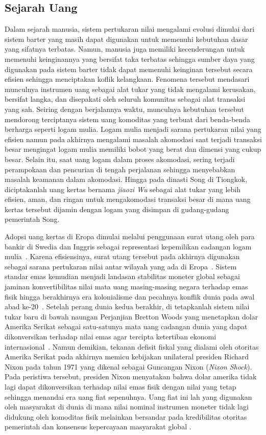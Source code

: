 \subsection{Sejarah Uang}
Dalam sejarah manusia, sistem pertukaran nilai mengalami evolusi dimulai dari sistem barter yang masih dapat digunakan untuk memenuhi kebutuhan dasar yang sifatnya terbatas. Namun, manusia juga memiliki kecenderungan untuk memenuhi keinginannya yang bersifat taka terbatas sehingga sumber daya yang digunakan pada sistem barter tidak dapat memenuhi keinginan tersebut secara efisien sehingga menciptakan koflik kelangkaan. Fenomena tersebut mendasari munculnya instrumen uang sebagai alat tukar yang tidak mengalami kerusakan, bersifat langka, dan disepakati oleh seluruh komunitas sebagai alat transaksi yang sah. Seiring dengan berjalannya waktu, munculnya kebutuhan tersebut mendorong terciptanya sistem uang komoditas yang terbuat dari benda-benda berharga seperti logam mulia. Logam mulia menjadi sarana pertukaran nilai yang efisien namun pada akhirnya mengalami masalah akomodasi saat terjadi transaksi besar mengingat logam mulia memiliki bobot yang berat dan dimensi yang cukup besar. Selain itu, saat uang logam dalam proses akomodasi, sering terjadi perampokaan dan pencurian di tengah perjalanan sehingga menyebabkan masalah keamanan dalam akomodasi. Hingga pada dinasti Song di Tiongkok, diciptakanlah uang kertas bernama \textit{jiaozi Wu} sebagai alat tukar yang lebih efisien, aman, dan ringan untuk mengakomodasi transaksi besar di mana uang kertas tersebut dijamin dengan logam yang disimpan di gudang-gudang pemerintah Song. 

Adopsi uang kertas di Eropa dimulai melalui penggunaan surat utang oleh para bankir di Swedia dan Inggris sebagai representasi kepemilikan cadangan logam mulia~. Karena efisiensinya, surat utang tersebut pada akhirnya digunakan sebagai sarana pertukaran nilai antar wilayah yang ada di Eropa~. Sistem standar emas kemudian menjadi landasan stabilitas moneter global sebagai jaminan konvertibilitas nilai mata uang masing-masing negara terhadap emas fisik hingga berakhirnya era kolonialisme dan pecahnya konflik dunia pada awal abad ke-20~. Setelah perang dunia kedua berakhir, di tetapkanlah sistem nilai tukar baru di bawah naungan Perjanjian Bretton Woods yang menetapkan dolar Amerika Serikat sebagai satu-satunya mata uang cadangan dunia yang dapat dikonversikan terhadap nilai emas  agar tercipta ketertiban ekonomi internasional~. Namun demikian, tekanan defisit fiskal yang dialami oleh otoritas Amerika Serikat pada akhirnya memicu kebijakan unilateral presiden Richard Nixon pada tahun 1971 yang dikenal sebagai Guncangan Nixon (\textit{Nixon Shock}). Pada peristiwa tersebut, presiden Nixon menyatakan bahwa dolar amerika tidak lagi dapat dikonversikan terhadap nilai emas fisik dengan nilai yang tetap sehingga menandai era uang fiat sepenuhnya. Uang fiat ini lah yang digunakan oleh masyarakat di dunia di mana nilai nominal instrumen moneter tidak lagi didukung oleh komoditas fisik melainkan bersandar pada kredibilitas otoritas pemerintah dan konsensus kepercayaan masyarakat global .

